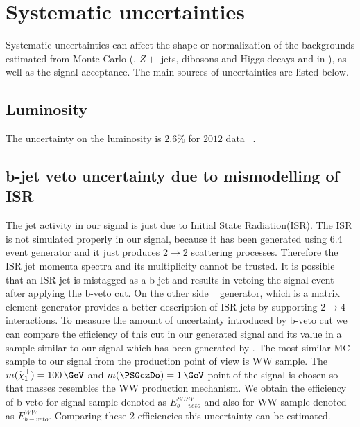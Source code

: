 \section{Systematic uncertainties}
\label{sect:sys}
Systematic uncertainties can affect the shape or normalization of the
backgrounds estimated from Monte Carlo (\ttbar, $Z+$ jets, dibosons and Higgs decays and \wjets in \tauTau \bintwo), 
as well as the signal acceptance. 
The main sources of uncertainties are listed below.
\subsection{Luminosity}
The uncertainty on the luminosity  is $2.6\%$ for $2012$ data ~\cite{LUMI}.

\subsection{b-jet veto uncertainty due to mismodelling of ISR}
The jet activity in our signal is just due to Initial State Radiation(ISR). The ISR is not simulated properly in our signal, because it has been generated using \PYTHIA $6.4$ event generator and it just produces $2 \rightarrow 2$ scattering processes. Therefore the ISR jet momenta spectra and its multiplicity cannot be trusted. It is possible that an ISR jet is mistagged as a b-jet and results in vetoing the signal event after applying the b-veto cut. On the other side \MADGRAPH ~\cite{MADGRAPH} generator, which is a matrix element generator provides a better description of ISR jets by supporting $2 \rightarrow 4$ interactions. To measure the amount of uncertainty introduced by b-veto cut we can compare the efficiency of this cut in our generated signal and its value in a sample similar to our signal which has been generated by \MADGRAPH. 
The most similar MC sample to our signal from the production point of view is WW sample. The $m(\chione) = 100\,\GeV$ and $m(\PSGczDo) = 1\,\GeV$ point of the signal is chosen so that masses resembles the WW production mechanism. %
We obtain the efficiency of b-veto for signal sample denoted as $E^{SUSY}_{b-veto}$ and also for WW sample denoted as $E^{WW}_{b-veto}$.
Comparing these 2 efficiencies this uncertainty can be estimated.


